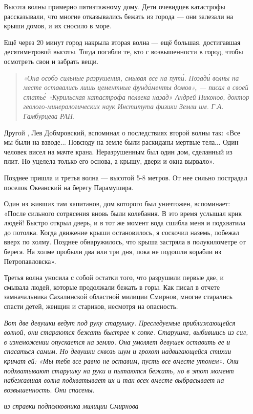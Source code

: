 Высота волны примерно  пятиэтажному дому. Дети очевидцев катастрофы рассказывали, что многие отказывались бежать из города --- они залезали на крыши домов, и их сносило в море.

Ещё через 20 минут город накрыла вторая волна --- ещё большая, достигавшая десятиметровой высоты. Тогда погибли те, кто  с возвышенности в город, чтобы осмотреть свои  и забрать вещи.

\begin{quote}
    \it «Она  особо сильные разрушения, смывая все  на пут\'{и}. Позад\'{и} волны на месте оставались лишь цементные фунд\'{а}менты домов», --- писал в своей стать\'{е} «Курильская катастрофа полвека назад» Андрей Никонов, доктор геолого-минералогических наук Института физики Земли им. Г.А. Гамбурцева РАН.
\end{quote}

Другой , Лев Добмровский, вспоминал о последствиях второй волны так: «Все мы были на взводе... Повсюду на земле были раскиданы мертвые тела... Один человек висел на мачте крана. Неразрушенным был один дом, сделанный из плит. Но уцелела только его основа, а крышу, двери и окна вырвало».

Позднее пришла и третья волна --- высотой 5-8 метров. От нее сильно пострадал поселок Океанский на берегу Парамушира.


Один из живших там капитанов, дом которого был уничтожен, вспоминает: «После сильного сотрясения вновь были колебания. В это время услышал крик людей! Быстро открыл дверь, и в тот же момент вода сшибла меня и подхватила до потолка. Когда движение крыши остановилось, я соскочил наземь, побежал вверх по холму. Позднее обнаружилось, что крыша застряла в полукилометре от берега. На холме пробыли два или три дня, пока не подошли корабли из Петропавловска».

Третья волна уносила с собой остатки того, что разрушили первые две, и смывала людей, которые продолжали бежать в горы. Как писал в отчете замначальника Сахалинской областной милиции Смирнов, многие старались спасти детей, женщин и стариков, несмотря на опасность.

\begin{fancyquotes}
    \it
    Вот две девушки ведут под руку старушку. Преследуемые приближающейся волной, они стараются бежать быстрее к сопке. Старушка, выбившись из сил, в изнеможении опускается на землю. Она умоляет девушек оставить ее и спасаться самим. Но девушки сквозь шум и грохот надвигающейся стихии кричат ей: «Мы тебя все равно не оставим, пусть все вместе утонем». Они подхватывают старушку на руки и пытаются бежать, но в этот момент набежавшая волна подхватывает их и так всех вместе выбрасывает на возвышенность. Они спасены.

    \begin{flushright}\it
        из справки подполковника милиции Смирнова
    \end{flushright}
\end{fancyquotes}

